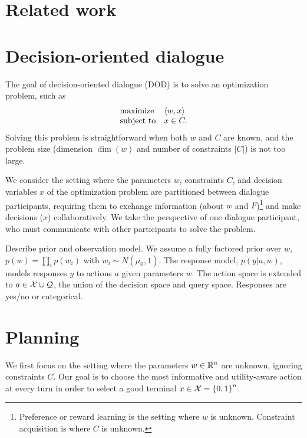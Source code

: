 \documentclass{article}
\theoremstyle{plain}
\theoremstyle{definition}
\theoremstyle{remark}
\begin{document}
\section{Related work}

\section{Decision-oriented dialogue}
The goal of decision-oriented dialogue (DOD) is to solve an optimization problem, such as
\begin{equation}
\label{eqn:obj}
\begin{array}{ll}
\mbox{maximize} & \left\langle w,x\right\rangle\\
\mbox{subject to} & x \in C.
\end{array}
\end{equation}
Solving this problem is straightforward when both $w$ and $C$ are known,
and the problem size (dimension $\dim(w)$ and number of constraints $|C|$) is not too large.

We consider the setting where the parameters $w$, constraints $C$, and decision variables $x$ of the optimization problem are partitioned between dialogue participants, requiring them to exchange information (about $w$ and $F$)\footnote{Preference or reward learning is the setting where $w$ is unknown. Constraint acquisition is where $C$ is unknown.} and make decisions  ($x$) collaboratively.
We take the perspective of one dialogue participant, who must communicate with other participants to solve the problem.

Describe prior and observation model.
We assume a fully factored prior over $w$, $p(w) = \prod_i p(w_i)$ with $w_i\sim N(\mu_0,1)$.
The response model, $p(y | a,w)$, models responses $y$ to actions $a$ given parameters $w$.
The action space is extended to $a \in \mathcal{X} \cup \mathcal{Q}$, the union of the decision space and query space.
Responses are yes/no or categorical.

\section{Planning}
We first focus on the setting where the parameters $w\in\mathbb{R}^n$ are unknown, ignoring constraints $C$.
Our goal is to choose the most informative and utility-aware action at every turn in order to select a good terminal $x\in\mathcal{X} = \left\{0,1\right\}^n$.
\end{document}
